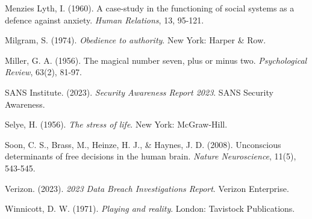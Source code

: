 \documentclass[11pt,a4paper]{article}
\begin{document}
\begin{thebibliography}{99}
Menzies Lyth, I. (1960). A case-study in the functioning of social systems as a defence against anxiety. \textit{Human Relations}, 13, 95-121.

Milgram, S. (1974). \textit{Obedience to authority}. New York: Harper \& Row.

Miller, G. A. (1956). The magical number seven, plus or minus two. \textit{Psychological Review}, 63(2), 81-97.

SANS Institute. (2023). \textit{Security Awareness Report 2023}. SANS Security Awareness.

Selye, H. (1956). \textit{The stress of life}. New York: McGraw-Hill.

Soon, C. S., Brass, M., Heinze, H. J., \& Haynes, J. D. (2008). Unconscious determinants of free decisions in the human brain. \textit{Nature Neuroscience}, 11(5), 543-545.

Verizon. (2023). \textit{2023 Data Breach Investigations Report}. Verizon Enterprise.

Winnicott, D. W. (1971). \textit{Playing and reality}. London: Tavistock Publications.

\end{thebibliography}
\end{document}
